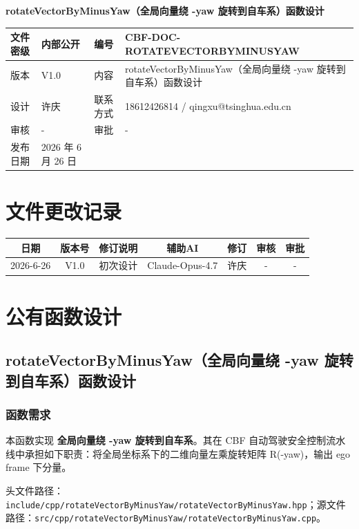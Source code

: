 \documentclass[a4paper,10pt]{article}
\begin{document}
\begin{titlepage}
    \centering
    {\Huge\textbf{rotateVectorByMinusYaw（全局向量绕 -yaw 旋转到自车系）函数设计}\par}
    \vspace{1.5cm}
    \renewcommand{\arraystretch}{1.5}
    \begin{tabular}{|l|l|l|l|}
        \hline
        文件密级 & 内部公开 & 编号 & CBF-DOC-ROTATEVECTORBYMINUSYAW \\ \hline
        版本 & V1.0 & 内容 & rotateVectorByMinusYaw（全局向量绕 -yaw 旋转到自车系）函数设计 \\ \hline
        设计 & 许庆 & 联系方式 & 18612426814 / qingxu@tsinghua.edu.cn \\ \hline
        审核 & - & 审批 & - \\ \hline
        发布日期 & 2026 年 6 月 26 日 & & \\ \hline
    \end{tabular}
    \vspace{1.5cm}
    \section*{文件更改记录}
    \begin{longtable}{|c|c|p{4cm}|c|c|c|c|}
        \hline
        日期 & 版本号 & 修订说明 & 辅助AI & 修订 & 审核 & 审批 \\ \hline
        2026-6-26 & V1.0 & 初次设计 & Claude-Opus-4.7 & 许庆 & - & - \\ \hline
    \end{longtable}
\end{titlepage}
\tableofcontents
\newpage
\section{公有函数设计}
\subsection{rotateVectorByMinusYaw（全局向量绕 -yaw 旋转到自车系）函数设计}
\subsubsection{函数需求}
\par 本函数实现 \textbf{全局向量绕 -yaw 旋转到自车系}。其在 CBF 自动驾驶安全控制流水线中承担如下职责：将全局坐标系下的二维向量左乘旋转矩阵 R(-yaw)，输出 ego frame 下分量。
\par 头文件路径：\texttt{include/cpp/rotateVectorByMinusYaw/rotateVectorByMinusYaw.hpp}；源文件路径：\texttt{src/cpp/rotateVectorByMinusYaw/rotateVectorByMinusYaw.cpp}。
\end{document}
